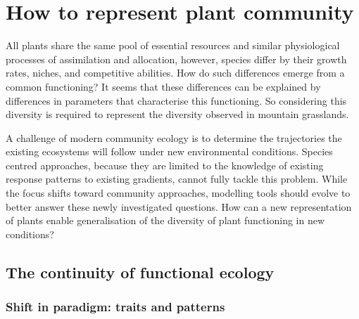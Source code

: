  

\chapter{How to represent plant community}

All plants share the same pool of essential resources and similar physiological processes of assimilation and allocation, however, species differ by their growth rates, niches, and competitive abilities. How do such differences emerge from a common functioning? It seems that these differences can be explained by differences in parameters that characterise this functioning. So considering this diversity is required to represent the diversity observed in mountain grasslands.

 A challenge of modern community ecology is to determine the trajectories the existing ecosystems will follow under new environmental conditions. Species centred approaches, because they are limited to the knowledge of existing response patterns to existing gradients, cannot fully tackle this problem. While the focus shifts toward community approaches, modelling tools should evolve to better answer these newly investigated questions. How can a new representation of plants enable generalisation of the diversity of plant functioning in new conditions?

\section{The continuity of functional ecology}

\subsection{Shift in paradigm: traits and patterns}




